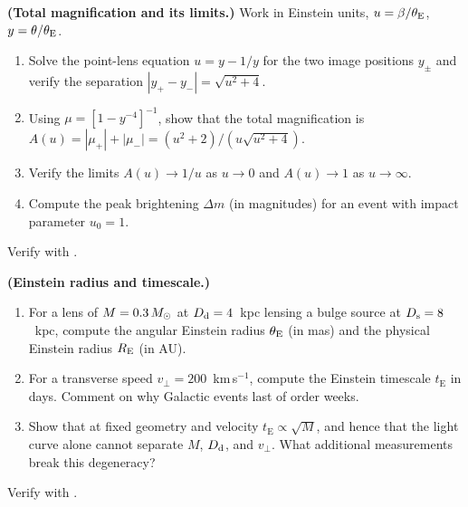 \begin{exercise}
\label{ex:micro_magnification}
\textbf{(Total magnification and its limits.)}
Work in Einstein units, $u = \beta/\theta_{\mathrm{E}}$, $y = \theta/\theta_{\mathrm{E}}$.
\begin{enumerate}[label=(\alph*)]
    \item Solve the point-lens equation $u = y - 1/y$ for the two image
          positions $y_\pm$ and verify the separation
          $|y_+ - y_-| = \sqrt{u^2+4}$.
    \item Using $\mu = [1 - y^{-4}]^{-1}$, show that the total magnification
          is $A(u) = |\mu_+| + |\mu_-| = (u^2+2)/(u\sqrt{u^2+4})$.
    \item Verify the limits $A(u)\to1/u$ as $u\to0$ and $A(u)\to1$ as
          $u\to\infty$.
    \item Compute the peak brightening $\Delta m$ (in magnitudes) for an event
          with impact parameter $u_0 = 1$.
\end{enumerate}
Verify with
.
\end{exercise}

\begin{exercise}
\label{ex:micro_timescale}
\textbf{(Einstein radius and timescale.)}
\begin{enumerate}[label=(\alph*)]
    \item For a lens of $M = 0.3\,M_{\odot}$ at $D_{\mathrm{d}} = 4$~kpc lensing a bulge
          source at $D_{\mathrm{s}} = 8$~kpc, compute the angular Einstein radius
          $\theta_{\mathrm{E}}$ (in mas) and the physical Einstein radius $R_{\mathrm{E}}$ (in AU).
    \item For a transverse speed $v_\perp = 200$~km\,s$^{-1}$, compute the
          Einstein timescale $t_{\mathrm{E}}$ in days.  Comment on why
          Galactic events last of order weeks.
    \item Show that at fixed geometry and velocity
          $t_{\mathrm{E}} \propto \sqrt{M}$, and hence that the light curve
          alone cannot separate $M$, $D_{\mathrm{d}}$, and $v_\perp$.  What additional
          measurements break this degeneracy?
\end{enumerate}
Verify with
.
\end{exercise}

